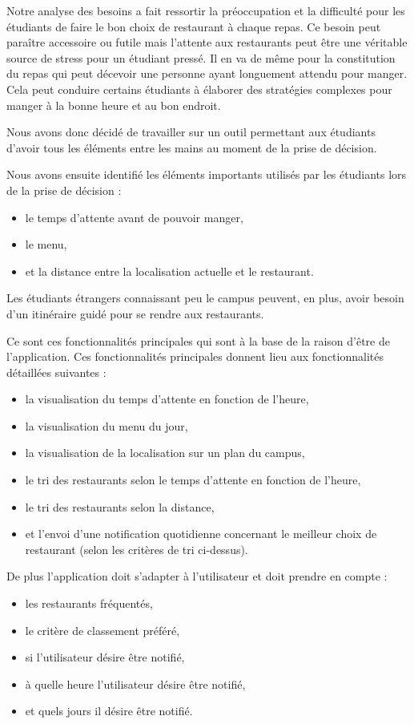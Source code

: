 Notre analyse des besoins a fait ressortir la préoccupation et la difficulté
pour les étudiants de faire le bon choix de restaurant à chaque repas.
Ce besoin peut paraître accessoire ou futile mais l'attente aux restaurants
peut être une véritable source de stress pour un étudiant pressé. Il en
va de même pour la constitution du repas qui peut décevoir une personne ayant
longuement attendu pour manger. Cela peut conduire certains étudiants à 
élaborer des stratégies complexes pour manger à la bonne heure et au bon
endroit.

Nous avons donc décidé de travailler sur un outil permettant aux étudiants
d'avoir tous les éléments entre les mains au moment de la prise de décision.

Nous avons ensuite identifié les éléments importants utilisés par les étudiants lors de la prise de décision :
\begin{itemize}
\item le temps d'attente avant de pouvoir manger,
\item le menu,
\item et la distance entre la localisation actuelle et le restaurant.
\end{itemize}

Les étudiants étrangers connaissant peu le campus peuvent, en plus, avoir besoin
d'un itinéraire guidé pour se rendre aux restaurants.

Ce sont ces fonctionnalités principales qui sont à la base de la raison
d'être de l'application.
Ces fonctionnalités principales donnent lieu aux fonctionnalités
détaillées suivantes :
\begin{itemize}
\item la visualisation du temps d'attente en fonction de
l'heure,
\item la visualisation du menu du jour,
\item la visualisation de la localisation sur un plan du campus,
\item le tri des restaurants selon le temps d'attente en fonction de l'heure,
\item le tri des restaurants selon la distance,
\item et l'envoi d'une notification quotidienne concernant le meilleur choix de restaurant
(selon les critères de tri ci-dessus).
\end{itemize}

De plus l'application doit s'adapter à l'utilisateur et doit prendre en
compte : 
\begin{itemize}
\item les restaurants fréquentés,
\item le critère de classement préféré,
\item si l'utilisateur désire être notifié,
\item à quelle heure l'utilisateur désire être notifié,
\item et quels jours il désire être notifié.
\end{itemize}